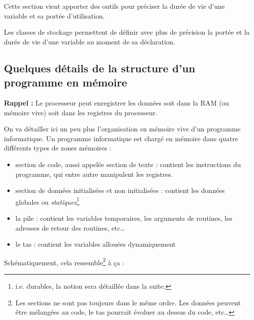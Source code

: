 \documentclass[../../../main.tex]{subfiles}
\begin{document}
Cette section vient apporter des outils pour préciser la durée de vie d'une variable et sa portée d'utilisation.

Les classes de stockage permettent de définir avec plus de précision la portée et la durée de vie d'une variable au moment de sa déclaration.
\subsection{Quelques détails de la structure d'un programme en mémoire}
\textbf{Rappel :} Le processeur peut enregistrer les données soit dans la RAM (ou mémoire vive) soit dans les registres du processeur.

On va détailler ici un peu plus l'organisation en mémoire vive d'un programme informatique. Un programme informatique est chargé en mémoire dans quatre différents types de zones mémoires :
\begin{itemize}
	\item section de code, aussi appelée section de texte : contient les instructions du programme, qui entre autre manipulent les registres.
	\item section de données initialisées et non initialisées : contient les données globales ou \textit{statiques}\footnote{i.e. durables, la notion sera détaillée dans la suite.}
	\item la pile : contient les variables temporaires, les arguments de routines, les adresses de retour des routines, etc\dots
	\item le tas : contient les variables allouées dynamiquement
\end{itemize}
Schématiquement, cela ressemble\footnote{Les sections ne sont pas toujours dans le même ordre. Les données peuvent être mélangées au code, le tas pourrait évoluer au dessus du code, etc\dots} à ça :

\begin{minipage}{\textwidth}
	\begin{center}
		
	\end{center}
\end{minipage}
\end{document}
